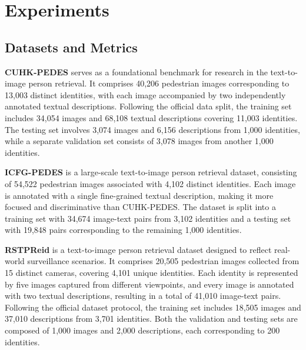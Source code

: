 \section{Experiments}
\subsection{Datasets and Metrics}
\textbf{CUHK-PEDES}\cite{CUHK-PEDES} serves as a foundational benchmark for research in the text-to-image person retrieval. It comprises 40,206 pedestrian images corresponding to 13,003 distinct identities, with each image accompanied by two independently annotated textual descriptions. Following the official data split, the training set includes 34,054 images and 68,108 textual descriptions covering 11,003 identities. The testing set involves 3,074 images and 6,156 descriptions from 1,000 identities, while a separate validation set consists of 3,078 images from another 1,000 identities.

\noindent\textbf{ICFG-PEDES}\cite{ding2021semantically} is a large-scale text-to-image person retrieval dataset, consisting of  54,522 pedestrian images associated with 4,102 distinct identities. Each image is annotated with a single fine-grained textual description, making it more focused and discriminative than CUHK-PEDES. The dataset is split into a training set with 34,674 image-text pairs from 3,102 identities and a testing set with 19,848 pairs corresponding to the remaining 1,000 identities.

\noindent\textbf{RSTPReid}\cite{zhu2021dssl} is a text-to-image person retrieval dataset designed to reflect real-world surveillance scenarios. It comprises 20,505 pedestrian images collected from 15 distinct cameras, covering 4,101 unique identities. Each identity is represented by five images captured from different viewpoints, and every image is annotated with two textual descriptions, resulting in a total of 41,010 image-text pairs. Following the official dataset protocol, the training set includes 18,505 images and 37,010 descriptions from 3,701 identities. Both the validation and testing sets are composed of 1,000 images and 2,000 descriptions, each corresponding to 200 identities.

